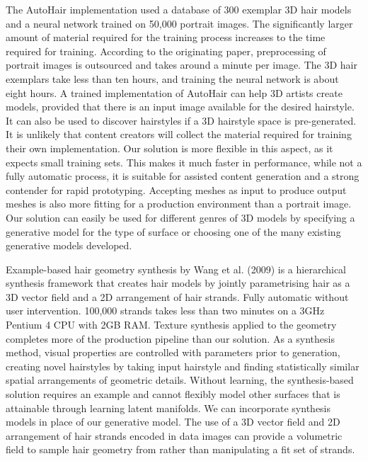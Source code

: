 \documentclass[ %
author={Dillon Keith Diep},
supervisor={Dr. Carl Henrik Ek},
degree={MEng},
title={ART-CG Hair:},
subtitle={Assisted Real-time Content Generation of Stylised Virtual Hair},
type={Research},
year={2017} ]{dissertation}
\begin{document}
The AutoHair implementation used a database of 300 exemplar 3D hair models and a neural network trained on 50,000 portrait images. The significantly larger amount of material required for the training process increases to the time required for training. According to the originating paper, preprocessing of portrait images is outsourced and takes around a minute per image. The 3D hair exemplars take less than ten hours, and training the neural network is about eight hours. A trained implementation of AutoHair can help 3D artists create models, provided that there is an input image available for the desired hairstyle. It can also be used to discover hairstyles if a 3D hairstyle space is pre-generated. It is unlikely that content creators will collect the material required for training their own implementation. Our solution is more flexible in this aspect, as it expects small training sets. This makes it much faster in performance, while not a fully automatic process, it is suitable for assisted content generation and a strong contender for rapid prototyping. Accepting meshes as input to produce output meshes is also more fitting for a production environment than a portrait image. Our solution can easily be used for different genres of 3D models by specifying a generative model for the type of surface or choosing one of the many existing generative models developed.

Example-based hair geometry synthesis by Wang et al. (2009) \cite{examplebasedhair} is a hierarchical synthesis framework that creates hair models by jointly parametrising hair as a 3D vector field and a 2D arrangement of hair strands. Fully automatic without user intervention. 100,000 strands takes less than two minutes on a 3GHz Pentium 4 CPU with 2GB RAM. Texture synthesis applied to the geometry completes more of the production pipeline than our solution. As a synthesis method, visual properties are controlled with parameters prior to generation, creating novel hairstyles by taking input hairstyle and finding statistically similar spatial arrangements of geometric details. Without learning, the synthesis-based solution requires an example and cannot flexibly model other surfaces that is attainable through learning latent manifolds. We can incorporate synthesis models in place of our generative model. The use of a 3D vector field and 2D arrangement of hair strands encoded in data images can provide a volumetric field to sample hair geometry from rather than manipulating a fit set of strands.
\end{document}
